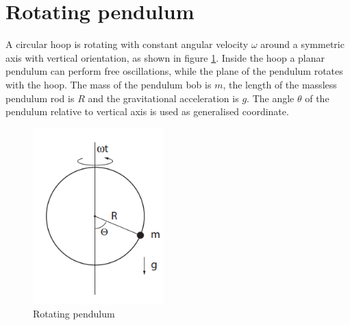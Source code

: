 \documentclass[11pt]{amsart}
\begin{document}
\section{Rotating pendulum}
A circular hoop is rotating with constant angular velocity $\omega$ around a symmetric axis with vertical orientation, as shown in figure \ref{fig:rotating_pendulum}. Inside the hoop a planar pendulum can perform free oscillations, while the plane of the pendulum rotates with the hoop. The mass of the pendulum bob is $m$, the length of the massless pendulum rod is $R$ and the gravitational acceleration is $g$. The angle $\theta$ of the pendulum relative to vertical axis is used as generalised coordinate.

\begin{figure}
\centering
	\includegraphics[width = 0.45\textwidth]{rotating_pendulum.png}
	\caption{Rotating pendulum}
	\label{fig:rotating_pendulum}
\end{figure}
\end{document}
